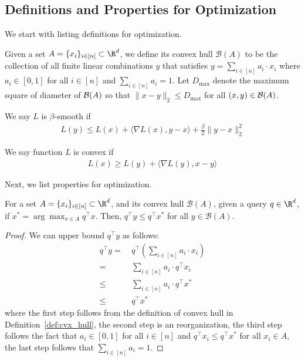 \iffalse
{}
\subsection{Definitions and  Properties for Optimization}

We start with listing definitions for optimization.
\begin{definition}\label{def:cvx_hull}
Given a set $A=\{x_i\}_{i\in [n]} \subset \R^d$, we define its convex hull $\mathcal{B}(A)$ to be the collection of all finite linear combinations $y$ that satisfies  $ y=\sum_{i\in [n]} a_i\cdot x_i$ where $a_i\in [0,1]$ for all $i\in[n]$ and $\sum_{i\in [n]}a_i= 1$.  Let $D_{\max}$ denote the maximum square of diameter of ${\cal B}(A)$ so that $\|x-y\|_2\leq D_{\max}$ for all $(x,y)\in {\cal B}(A)$.
\end{definition}




\begin{definition}[Smoothness]\label{def:smooth}
We say $L$ is $\beta$-smooth if 
\begin{align*}
L(y)\leq L(x)+\langle \nabla L(x),y-x \rangle+\frac{\beta}{2}\| y-x \|^2_2
\end{align*}
\end{definition}



\begin{definition}[Convex]\label{def:convex}
We say function $L$ is convex if 
\begin{align*}
L(x)\geq L(y)+\langle \nabla L(y),x-y \rangle
\end{align*}
\end{definition}



Next, we list properties for optimization.
\begin{corollary}\label{coro:hull_maxip}
For a set $A=\{x_i\}_{i\in [n]} \subset \R^d$, and its convex hull $\mathcal{B}(A)$, given a query $q\in \R^d$, if $x^*=\arg\max_{x\in A} q^\top x$. Then, $q^\top y \leq q^\top x^*$ for all $y\in \mathcal{B}(A)$.
\end{corollary}
\begin{proof}
We can upper bound $q^\top y$ as follows:
\begin{align*}
    q^\top y 
    =&~q^\top (\sum_{i\in [n]}a_i\cdot x_i)  \\
    = &~ \sum_{i\in [n]}a_i\cdot q^\top x_i\\
    \leq &~ \sum_{i\in [n]}a_i\cdot q^\top x^*\\
    \leq &~ q^\top x^*
\end{align*}
where the first step follows from the definition of convex hull in Definition~\ref{def:cvx_hull}, the second step is an reorganization, the third step follows the fact that $a_i\in [0,1]$ for all $i\in[n]$ and $q^\top x_i \leq q^\top x^*$ for all $x_i\in A$, the last step follows that $\sum_{i\in [n]}a_i= 1$.
\end{proof}




